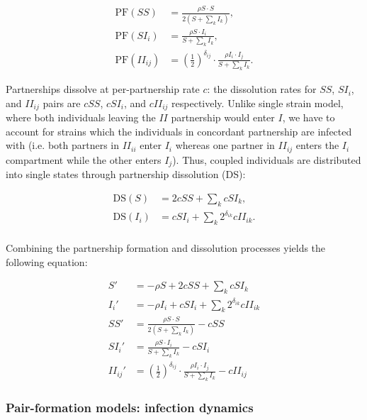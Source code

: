 \documentclass[10pt,letterpaper]{article}
\newcommand{\khalf}{\left(\frac{1}{2}\right)^{\delta_{ij}}}  %
\newcommand{\PF}{\textrm{PF}}
\newcommand{\DS}{\textrm{DS}}
\begin{document}
\begin{equation}
\begin{aligned}
\PF(SS) &= \frac{\rho S \cdot S}{2 (S + \sum_k I_k)},\\
\PF(SI_i) &= \frac{\rho S \cdot I_i}{S + \sum_k I_k},\\
\PF(II_{ij}) &= \khalf \cdot \frac{\rho I_i \cdot I_j}{S + \sum_k I_k}.
\end{aligned}
\end{equation}

Partnerships dissolve at per-partnership rate $c$: the dissolution rates for $SS$, $SI_i$, and $II_{ij}$ pairs are $c SS$, $c SI_i$, and $c II_{ij}$ respectively. Unlike single strain model, where both individuals leaving the $II$ partnership would enter $I$, we have to account for strains which the individuals in concordant partnership are infected with (i.e. both partners in $II_{ii}$ enter $I_i$ whereas one partner in $II_{ij}$ enters the $I_i$ compartment while the other enters $I_j$). Thus, coupled individuals are distributed into single states through partnership dissolution (DS):

\begin{equation}
\begin{aligned}
\DS(S) &= 2 c SS + \sum_k c SI_k, \\
\DS(I_i) &= c SI_i + \sum_k 2^{\delta_{ik}} c II_{ik}.\\
\end{aligned}
\end{equation}

Combining the partnership formation and dissolution processes yields the following equation:

\begin{equation}
\begin{aligned}
S' &= - \rho S + 2 c SS + \sum_k c SI_k \\
I_i' &= - \rho I_i + c SI_i + \sum_k 2^{\delta_{ik}} c II_{ik}\\
SS' &= \frac{\rho S \cdot S}{2 (S + \sum_k I_k)} - c SS\\
SI_i' &= \frac{\rho S \cdot I_i}{S + \sum_k I_k} - c SI_i\\
II_{ij}' &= \khalf \cdot \frac{\rho I_i \cdot I_j}{S + \sum_k I_k} - c II_{ij}
\end{aligned}
\end{equation}

\subsubsection*{Pair-formation models: infection dynamics}
\end{document}
